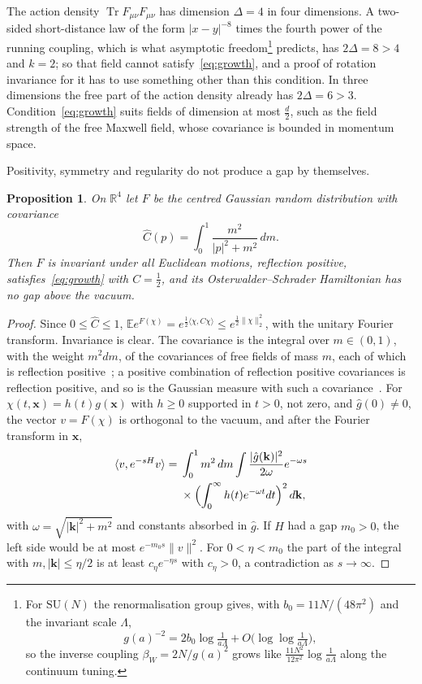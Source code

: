 \documentclass[11pt]{amsart}
\newtheorem{proposition}[theorem]{Proposition}
\theoremstyle{definition}
\theoremstyle{remark}
\numberwithin{equation}{section}
\newcommand{\R}{\mathbb{R}}
\newcommand{\E}{\mathbb{E}}
\newcommand{\SU}{\mathrm{SU}}
\newcommand{\Tr}{\operatorname{Tr}}
\newcommand{\ip}[2]{\langle #1,#2\rangle}
\begin{document}
The action density $\Tr F_{\mu\nu}F_{\mu\nu}$ has dimension $\Delta=4$ in four
dimensions. A two-sided short-distance law of the form $|x-y|^{-8}$ times
the fourth power of the running coupling, which is what asymptotic freedom\footnote{For $\SU(N)$ the renormalisation group gives, with $b_0=11N/(48\pi^2)$ and the invariant scale $\Lambda$,
\[
g(a)^{-2}=2b_0\log\tfrac1{a\Lambda}+O\bigl(\log\log\tfrac1{a\Lambda}\bigr),
\]
so the inverse coupling $\beta_W=2N/g(a)^2$ grows like $\frac{11N^2}{12\pi^2}\log\frac1{a\Lambda}$ along the continuum tuning.}
predicts, has $2\Delta=8>4$ and $k=2$; so that field
cannot satisfy~\eqref{eq:growth}, and a proof of rotation invariance for it
has to use something other than this condition. In three dimensions the free part of the action density
already has $2\Delta=6>3$. Condition~\eqref{eq:growth} suits fields of
dimension at most $\frac d2$, such as the field strength of the free Maxwell
field, whose covariance is bounded in momentum space.

Positivity, symmetry and regularity do not produce a gap by themselves.

\begin{proposition}\label{prop:nogapgff}
On $\R^4$ let $F$ be the centred Gaussian random distribution with
covariance
\[
\widehat C(p)=\int_0^1\frac{m^2}{|p|^2+m^2}\,dm .
\]
Then $F$ is invariant under all Euclidean motions, reflection positive,
satisfies~\eqref{eq:growth} with $C=\frac12$, and its Osterwalder--Schrader
Hamiltonian has no gap above the vacuum.
\end{proposition}

\begin{proof}
Since $0\le\widehat C\le1$, $\E e^{F(\chi)}=e^{\frac12\ip\chi{C\chi}}\le e^{\frac12
\|\chi\|_2^2}$, with the unitary Fourier transform. Invariance is clear. The
covariance is the integral over $m\in(0,1)$, with the weight $m^2dm$, of the
covariances of free fields of mass $m$, each of which is reflection
positive~\cite[Sect.~6.2]{GJ87}; a positive combination of reflection
positive covariances is reflection positive, and so is the Gaussian measure
with such a covariance~\cite[Sect.~6.2]{GJ87}. For $\chi(t,\mathbf x)=h(t)g(\mathbf x)$
with $h\ge0$ supported in $t>0$, not zero, and $\hat g(0)\ne0$, the vector
$v=F(\chi)$ is orthogonal to the vacuum, and after the Fourier transform in
$\mathbf x$,
\[
\begin{split}
\ip v{e^{-sH}v}={}&\int_0^1m^2\,dm\int\frac{|\hat g(\mathbf k)|^2}{2\omega}
e^{-\omega s}\\
&\times\Bigl(\int_0^\infty h(t)e^{-\omega t}dt\Bigr)^2\,d\mathbf k ,
\end{split}
\]
with $\omega=\sqrt{|\mathbf k|^2+m^2}$ and constants absorbed in $\hat g$.
If $H$ had a gap $m_0>0$, the left side would be at most $e^{-m_0s}\|v\|^2$.
For $0<\eta<m_0$ the part of the integral with $m,|\mathbf k|\le\eta/2$ is at
least $c_\eta e^{-\eta s}$ with $c_\eta>0$, a contradiction as $s\to\infty$.
\end{proof}
\end{document}

